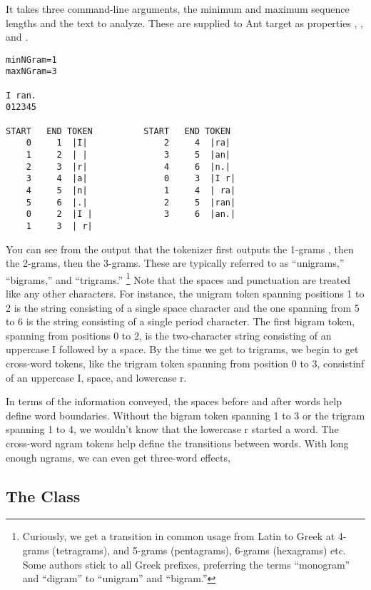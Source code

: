It takes three command-line arguments, the
minimum and maximum sequence lengths and the text to analyze.
These are supplied to Ant target  as 
properties , , and .
%
\begin{verbatim}
minNGram=1
maxNGram=3

I ran.
012345

START   END TOKEN          START   END TOKEN
    0     1  |I|               2     4  |ra|
    1     2  | |               3     5  |an|
    2     3  |r|               4     6  |n.|
    3     4  |a|               0     3  |I r|
    4     5  |n|               1     4  | ra|
    5     6  |.|               2     5  |ran|
    0     2  |I |              3     6  |an.|
    1     3  | r|
\end{verbatim}
%
You can see from the output that the tokenizer first outputs the
1-grams , then the 2-grams, then the 3-grams.  These are typically
referred to as ``unigrams,'' ``bigrams,'' and ``trigrams.''%
%
\footnote{Curiously, we get a transition in common usage from Latin to Greek at
4-grams (tetragrams), and 5-grams (pentagrams), 6-grams (hexagrams)
etc.  Some authors stick to all Greek prefixes, preferring the terms
``monogram'' and ``digram'' to ``unigram'' and ``bigram.''}
%
Note that the spaces and punctuation are treated like any other
characters.  For instance, the unigram token spanning positions 1 to 2
is the string consisting of a single space character and the one
spanning from 5 to 6 is the string consisting of a single period
character.  The first bigram token, spanning from positions 0 to 2, is
the two-character string consisting of an uppercase I followed by a
space.  By the time we get to trigrams, we begin to get cross-word
tokens, like the trigram token spanning from position 0 to 3,
consistinf of an uppercase I, space, and lowercase r.

In terms of the information conveyed, the spaces before and after
words help define word boundaries.  Without the bigram token spanning
1 to 3 or the trigram spanning 1 to 4, we wouldn't know that the
lowercase r started a word.  The cross-word ngram tokens help define
the transitions between words.  With long enough ngrams, we can even
get three-word effects, 


\subsection{The  Class}

